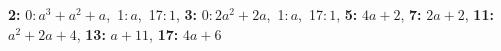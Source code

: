 \textsf{\bfseries 2:} 0:\,$a^3 + a^2 + a$,\ 1:\,$a$,\ 17:\,$1$, \textsf{\bfseries 3:} 0:\,$2a^2 + 2a$,\ 1:\,$a$,\ 17:\,$1$, \textsf{\bfseries 5:} $4a + 2$, \textsf{\bfseries 7:} $2a + 2$, \textsf{\bfseries 11:} $a^2 + 2a + 4$, \textsf{\bfseries 13:} $a + 11$, \textsf{\bfseries 17:} $4a + 6$